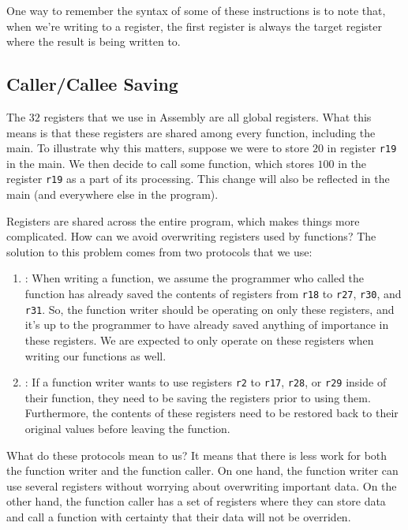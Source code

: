 One way to remember the syntax of some of these instructions is to note that, when we're writing to a register, the first register is always the target register where the result is being written to. 

\subsection{Caller/Callee Saving}

The $32$ registers that we use in Assembly are all global registers. What this means is that these registers are shared among every function, including the main. To illustrate why this matters, suppose we were to store $20$ in register \verb!r19! in the main. We then decide to call some function, which stores $100$ in the register \verb!r19! as a part of its processing. This change will also be reflected in the main (and everywhere else in the program). 

Registers are shared across the entire program, which makes things more complicated. How can we avoid overwriting registers used by functions? The solution to this problem comes from two protocols that we use: \begin{enumerate}
    \item {}: When writing a function, we assume the programmer who called the function has already saved the contents of registers from \verb!r18! to \verb!r27!, \verb!r30!, and \verb!r31!. So, the function writer should be operating on only these registers, and it's up to the programmer to have already saved anything of importance in these registers. We are expected to only operate on these registers when writing our functions as well.
    \item {}: If a function writer wants to use registers \verb!r2! to \verb!r17!, \verb!r28!, or \verb!r29! inside of their function, they need to be saving the registers prior to using them. Furthermore, the contents of these registers need to be restored back to their original values before leaving the function.
\end{enumerate}

What do these protocols mean to us? It means that there is less work for both the function writer and the function caller. On one hand, the function writer can use several registers without worrying about overwriting important data. On the other hand, the function caller has a set of registers where they can store data and call a function with certainty that their data will not be overriden. \\


